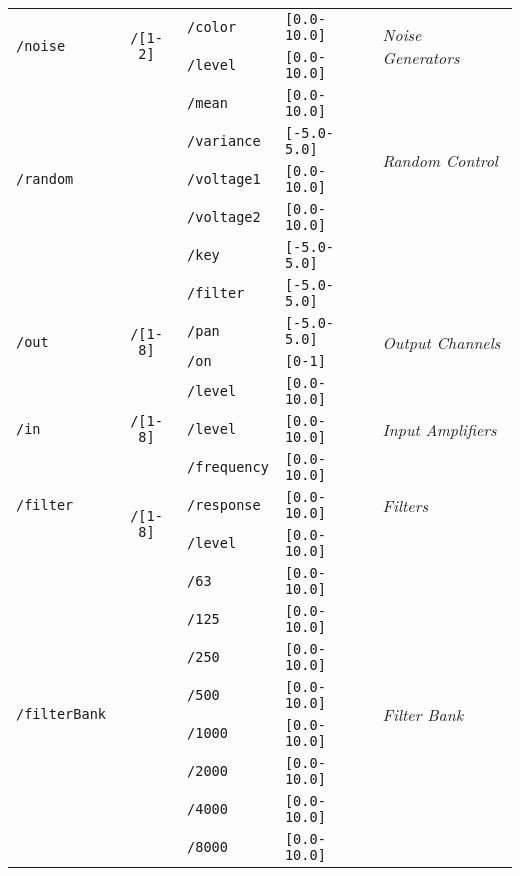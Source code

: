 \begin{longtable}{ l c l l l }
    \hline
    \multirow{2}{*}{\texttt{/noise}}	& \multirow{2}{*}{\texttt{/[1-2]}}	& \texttt{/color}	&\texttt{[0.0-10.0]} & \multirow{2}{*}{\textit{Noise Generators}}\\
    & & \texttt{/level} &\texttt{[0.0-10.0]}& \\
    \hline
    
    \hline
    \multirow{5}{*}{\texttt{/random}}	& 	& \texttt{/mean}	&\texttt{[0.0-10.0]} \\
    & & \texttt{/variance} &\texttt{[-5.0-5.0]}&  \multirow{2}{*}{\textit{Random Control}}\\
    & & \texttt{/voltage1} &\texttt{[0.0-10.0]}& \multirow{2}{*}{\textit{Voltage Generator}}\\
    & & \texttt{/voltage2} &\texttt{[0.0-10.0]}& \\
    & & \texttt{/key} &\texttt{[-5.0-5.0]}& \\
    \hline
    
    \multirow{4}{*}{\texttt{/out}}	& \multirow{4}{*}{\texttt{/[1-8]}}	& \texttt{/filter}	&\texttt{[-5.0-5.0]} & \multirow{4}{*}{\textit{Output Channels}}\\
    & & \texttt{/pan} & \texttt{[-5.0-5.0]} & \\
    & & \texttt{/on} & \texttt{[0-1]} & \\
    & & \texttt{/level} & \texttt{[0.0-10.0]} &\\
    \hline
    
    \multirow{1}{*}{\texttt{/in}}	& \multirow{1}{*}{\texttt{/[1-8]}}	& \texttt{/level}	&\texttt{[0.0-10.0]} & \multirow{1}{*}{\textit{Input Amplifiers}}\\
    \hline
    
    \multirow{3}{*}{\texttt{/filter}}	& \multirow{4}{*}{\texttt{/[1-8]}}	& \texttt{/frequency}	&\texttt{[0.0-10.0]} & \multirow{3}{*}{\textit{Filters}}\\
    & & \texttt{/response} & \texttt{[0.0-10.0]} & \\
    & & \texttt{/level} & \texttt{[0.0-10.0]} & \\
    \hline
    
    \multirow{8}{*}{\texttt{/filterBank}}	& 	& \texttt{/63}	&\texttt{[0.0-10.0]} & \multirow{8}{*}{\textit{Filter Bank}}\\
    & & \texttt{/125} & \texttt{[0.0-10.0]} & \\
    & & \texttt{/250} & \texttt{[0.0-10.0]} & \\
    & & \texttt{/500} & \texttt{[0.0-10.0]} & \\
    & & \texttt{/1000} & \texttt{[0.0-10.0]} & \\
    & & \texttt{/2000} & \texttt{[0.0-10.0]} & \\
    & & \texttt{/4000} & \texttt{[0.0-10.0]} & \\
    & & \texttt{/8000} & \texttt{[0.0-10.0]} & \\
    \hline
    

\end{longtable}
